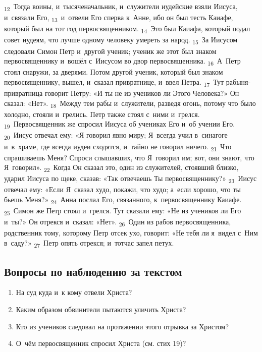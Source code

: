 \documentclass[a4paper,12pt]{article}
\begin{document}
\textsubscript{12}~Тогда воины, и~тысяченачальник, и~служители иудейские взяли Иисуса, и~связали Его,
\textsubscript{13}~и~отвели Его сперва к~Анне, ибо он был тесть Каиафе, который был на тот год первосвященником.
\textsubscript{14}~Это был Каиафа, который подал совет иудеям, что лучше одному человеку умереть за народ.
\textsubscript{15}~За Иисусом следовали Симон Петр и~другой ученик; ученик же этот был знаком первосвященнику и~вошёл с~Иисусом во двор первосвященника.
\textsubscript{16}~А~Петр стоял снаружи, за дверями. Потом другой ученик, который был знаком первосвященнику, вышел, и~сказал привратнице, и~ввел Петра.
\textsubscript{17}~Тут рабыня-привратница говорит Петру: «И ты не из учеников ли Этого Человека?» Он сказал: «Нет».
\textsubscript{18}~Между тем рабы и~служители, разведя огонь, потому что было холодно, стояли и~грелись. Петр также стоял с~ними и~грелся.
\textsubscript{19}~Первосвященник же спросил Иисуса об учениках Его и~об учении Его.
\textsubscript{20}~Иисус отвечал ему: «Я говорил явно миру; Я~всегда учил в~синагоге и~в~храме, где всегда иудеи сходятся, и~тайно не говорил ничего.
\textsubscript{21}~Что спрашиваешь Меня? Спроси слышавших, что Я~говорил им; вот, они знают, что Я~говорил».
\textsubscript{22}~Когда Он сказал это, один из служителей, стоявший близко, ударил Иисуса по щеке, сказав: «Так отвечаешь Ты первосвященнику?»
\textsubscript{23}~Иисус отвечал ему: «Если Я~сказал худо, покажи, что худо; а~если хорошо, что ты бьешь Меня?»
\textsubscript{24}~Анна послал Его, связанного, к~первосвященнику Каиафе.
\textsubscript{25}~Симон же Петр стоял и~грелся. Тут сказали ему: «Не из учеников ли Его и~ты?» Он отрекся и~сказал: «Нет».
\textsubscript{26}~Один из рабов первосвященника, родственник тому, которому Петр отсек ухо, говорит: «Не тебя ли я~видел с~Ним в~саду?»
\textsubscript{27}~Петр опять отрекся; и~тотчас запел петух. 

\subsection*{Вопросы по наблюдению за текстом}
\begin{enumerate}
    \item На суд куда и~к кому отвели Христа? 
    
    \myline
    
    \myline
    \item Каким образом обвинители пытаются уличить Христа? 
    
    \myline
    
    \myline
    \item Кто из учеников следовал на протяжении этого отрывка за Христом? 
    
    \myline
    
    \myline
    \item О~чём первосвященник спросил Христа (см. стих 19)? 
    
    \myline
    
    \myline
\end{enumerate}
\end{document}
